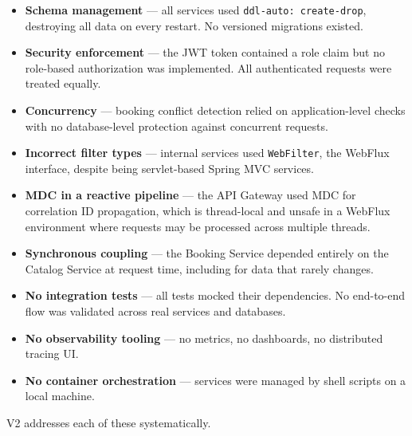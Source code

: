 \begin{itemize}
    \item \textbf{Schema management} --- all services used \texttt{ddl-auto: create-drop}, destroying all data on every restart. No versioned migrations existed.
    \item \textbf{Security enforcement} --- the JWT token contained a role claim but no role-based authorization was implemented. All authenticated requests were treated equally.
    \item \textbf{Concurrency} --- booking conflict detection relied on application-level checks with no database-level protection against concurrent requests.
    \item \textbf{Incorrect filter types} --- internal services used \texttt{WebFilter}, the WebFlux interface, despite being servlet-based Spring MVC services.
    \item \textbf{MDC in a reactive pipeline} --- the API Gateway used MDC for correlation ID propagation, which is thread-local and unsafe in a WebFlux environment where requests may be processed across multiple threads.
    \item \textbf{Synchronous coupling} --- the Booking Service depended entirely on the Catalog Service at request time, including for data that rarely changes.
    \item \textbf{No integration tests} --- all tests mocked their dependencies. No end-to-end flow was validated across real services and databases.
    \item \textbf{No observability tooling} --- no metrics, no dashboards, no distributed tracing UI.
    \item \textbf{No container orchestration} --- services were managed by shell scripts on a local machine.
\end{itemize}

V2 addresses each of these systematically.